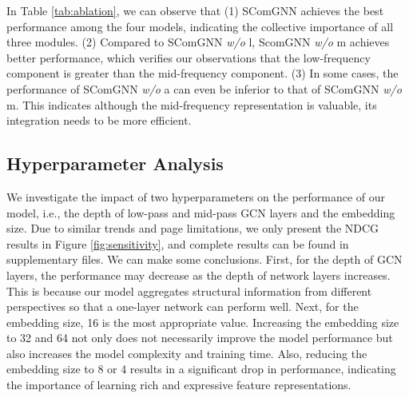 \documentclass[letterpaper]{article} %
\begin{document}
 In Table \ref{tab:ablation}, we can observe that (1) SComGNN achieves the best performance among the four models, indicating the collective importance of all three modules. (2) Compared to SComGNN \textit{w/o} l, ScomGNN \textit{w/o} m achieves better performance, which verifies our observations that the low-frequency component is greater than the mid-frequency component. (3) In some cases, the performance of SComGNN \textit{w/o} a can even be inferior to that of SComGNN \textit{w/o} m. This indicates although the mid-frequency representation is valuable, its integration needs to be more efficient.
 
 \subsection{Hyperparameter Analysis}

 We investigate the impact of two hyperparameters on the performance of our model, i.e., the depth of low-pass and mid-pass GCN layers and the embedding size. Due to similar trends and page limitations, we only present the NDCG results in Figure \ref{fig:sensitivity}, and complete results can be found in supplementary files. We can make some conclusions. First, for the depth of GCN layers, the performance may decrease as the depth of network layers increases. This is because our model aggregates structural information from different perspectives so that a one-layer network can perform well. Next, for the embedding size, 16 is the most appropriate value. Increasing the embedding size to 32 and 64 not only does not necessarily improve the model performance but also increases the model complexity and training time. Also, reducing the embedding size to 8 or 4 results in a significant drop in performance, indicating the importance of learning rich and expressive feature representations.
\end{document}
